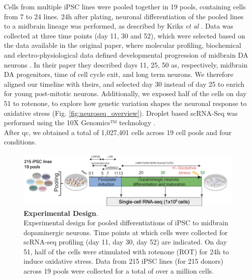 Cells from multiple iPSC lines were pooled together in 19 pools, containing cells from 7 to 24 lines.
24h after plating, neuronal differentiation of the pooled lines to a midbrain lineage was performed, as described by Kriks \textit{et al} \cite{kriks2011dopamine}.
Data was collected at three time points (day 11, 30 and 52), which were selected based on the data available in the original paper, where molecular profiling, biochemical and electro-physiological data defined developmental progression of midbrain DA neurons \cite{kriks2011dopamine}. 
In their paper they described days 11, 25, 50
as, respectively, midbrain DA progenitors, time of cell cycle exit, 
and
long term neurons.
We therefore aligned our timeline with theirs, and selected day 30 instead of day 25 to enrich for young post-mitotic neurons. 
Additionally, we exposed half of the cells on day 51 to rotenone, to explore how genetic variation shapes the neuronal response to oxidative stress (Fig. \ref{fig:neuroseq_overview}). 
Droplet based scRNA-Seq was performed using the 10X Genomics™ technology \cite{zheng2017massively}.\\

After \gls{qc}, we obtained a total of 1,027,401 cells across 19 cell pools and four conditions. 

\begin{figure}[h]
\centering
\includegraphics[width=15.5cm]{Chapter5/Fig/neuroseq_experimental_design.png}
\caption[Experimental Design]{\textbf{Experimental Design}.\\
Experimental design for pooled differentiations of iPSC to midbrain dopaminergic neurons. 
Time points at which cells were collected for scRNA-seq profiling (day 11, day 30, day 52) are indicated. 
On day 51, half of the cells were stimulated with rotenone (ROT) for 24h to induce oxidative stress.
Data from 215 iPSC lines (for 215 donors) across 19 pools were collected for a total of over a million cells.}
\label{fig:neuroseq_experimental_design}
\end{figure}

